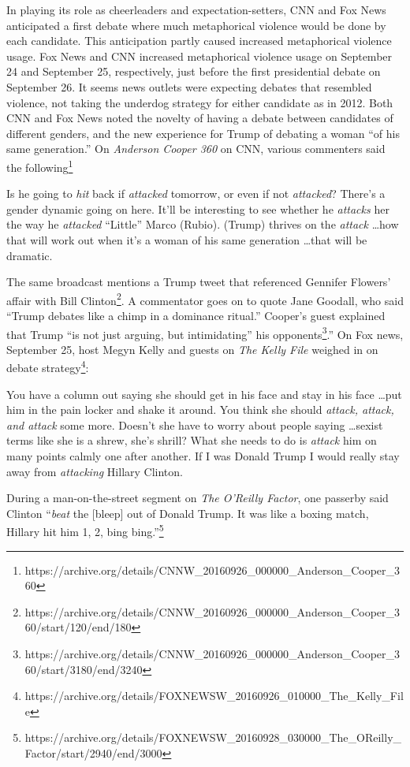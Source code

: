 In playing its role as cheerleaders and expectation-setters, 
CNN and Fox News anticipated a first debate where much metaphorical violence
would be done by each candidate. This anticipation partly caused increased 
metaphorical violence usage.
Fox News and CNN increased metaphorical violence usage on 
September 24 and September 25, respectively, just before the first 
presidential debate on September 26. 
It seems news outlets were expecting debates that resembled violence, not
taking the underdog strategy for either candidate as in 2012.
Both CNN and Fox News noted the novelty of having a debate between 
candidates of different genders, and the new experience for Trump of debating
a woman ``of his same generation.''
On \emph{Anderson Cooper 360} on CNN, various commenters said the 
following\footnote{\tiny https://archive.org/details/CNNW\_20160926\_000000\_Anderson\_Cooper\_360}

\begin{exe}
  \ex Is he going to \emph{hit} back if \emph{attacked} tomorrow, or even if not \emph{attacked}?
  \ex There's a gender dynamic going on here.  It'll be interesting to see 
    whether he \emph{attacks} her the way he \emph{attacked} ``Little'' Marco 
    (Rubio).
  \ex (Trump) thrives on the \emph{attack} \ldots how that will work out when 
    it's a woman of his same generation \ldots that will be dramatic.
\end{exe}

The same broadcast mentions a Trump tweet that referenced Gennifer Flowers'
affair with Bill Clinton\footnote{\tiny https://archive.org/details/CNNW\_20160926\_000000\_Anderson\_Cooper\_360/start/120/end/180}. A commentator goes on to quote
Jane Goodall, who said ``Trump debates like a chimp in a dominance ritual.''
Cooper's guest explained that Trump ``is not just arguing, but intimidating'' his 
opponents\footnote{\tiny https://archive.org/details/CNNW\_20160926\_000000\_Anderson\_Cooper\_360/start/3180/end/3240}.''
On Fox news, September 25, host Megyn Kelly and guests on \emph{The Kelly File} 
weighed in on debate 
strategy\footnote{\tiny https://archive.org/details/FOXNEWSW\_20160926\_010000\_The\_Kelly\_File}:
\begin{exe}
  \ex You have a column out saying she should get in his face and stay in his
    face \ldots put him in the pain locker and shake it around.
    You think she should \emph{attack, attack, and attack} some more. Doesn't she
    have to worry about people saying \ldots sexist terms like she is a shrew, 
    she's shrill?
  \ex What she needs to do is \emph{attack} him on many points calmly one after
    another.
  \ex If I was Donald Trump I would really stay away from \emph{attacking} Hillary
    Clinton.
\end{exe}
During a man-on-the-street segment on \emph{The O'Reilly Factor}, one 
passerby said Clinton ``\emph{beat} the [bleep] out of Donald Trump. It was
like a boxing match, Hillary hit him 1, 2, bing bing.''\footnote{\tiny https://archive.org/details/FOXNEWSW\_20160928\_030000\_The\_OReilly\_Factor/start/2940/end/3000} 


